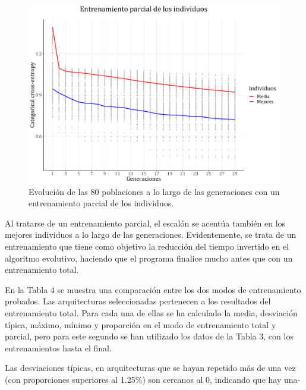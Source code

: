 \documentclass[spanish,a4paper,12pt,twoside]{report}
\begin{document}
  \begin{figure}[H]
    \centering
    \includegraphics[width = 1\textwidth]{resources/Fig19.pdf}
    \caption{Evolución de las 80 poblaciones a lo largo de las generaciones con un entrenamiento parcial de los individuos.}
    \label{fig:19}
  \end{figure} \par
  Al tratarse de un entrenamiento parcial, el escalón se acentúa también en los mejores individuos a lo largo de las generaciones. Evidentemente, se trata de un entrenamiento que tiene como objetivo la reducción del tiempo invertido en el algoritmo evolutivo, haciendo que el programa finalice mucho antes que con un entrenamiento total. \par
  En la Tabla 4 se muestra una comparación entre los dos modos de entrenamiento probados. Las arquitecturas seleccionadas pertenecen a los resultados del entrenamiento total. Para cada una de ellas se ha calculado la media, desviación típica, máximo, mínimo y proporción en el modo de entrenamiento total y parcial, pero para este segundo se han utilizado los datos de la Tabla 3, con los entrenamientos hasta el final. \par
  Las desviaciones típicas, en arquitecturas que se hayan repetido más de una vez (con proporciones superiores al 1.25\%) son cercanos al 0, indicando que hay una-
\end{document}

